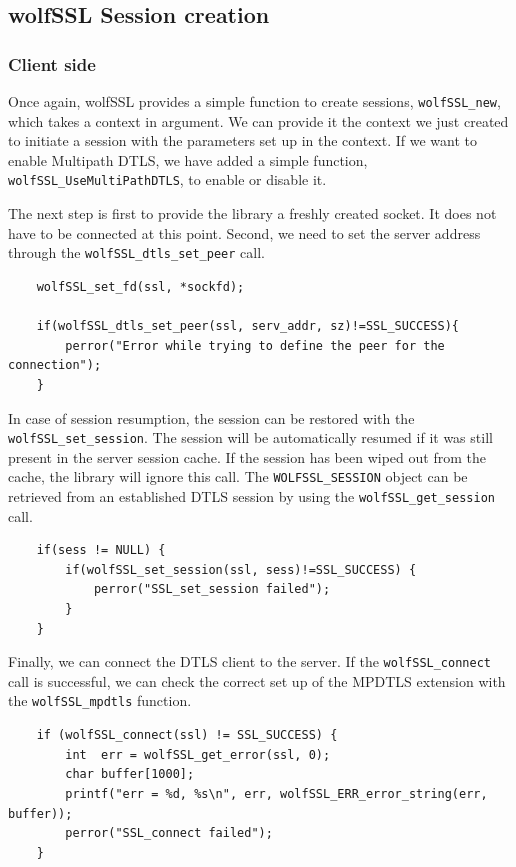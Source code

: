 \subsection{wolfSSL Session creation}

\subsubsection{Client side}

Once again, wolfSSL provides a simple function to create sessions, \texttt{wolfSSL\_new}, which takes a context in argument. We can provide it the context we just created to initiate a session with the parameters set up in the context. If we want to enable Multipath DTLS, we have added a simple function, \texttt{wolfSSL\_UseMultiPathDTLS}, to enable or disable it.

The next step is first to provide the library a freshly created socket. It does not have to be connected at this point. Second, we need to set the server address through the \texttt{wolfSSL\_dtls\_set\_peer} call.

\begin{lstlisting}
    wolfSSL_set_fd(ssl, *sockfd);
    
    if(wolfSSL_dtls_set_peer(ssl, serv_addr, sz)!=SSL_SUCCESS){
        perror("Error while trying to define the peer for the connection");
    }
\end{lstlisting}

In case of session resumption, the session can be restored with the \texttt{wolfSSL\_set\_session}. The session will be automatically resumed if it was still present in the server session cache. If the session has been wiped out from the cache, the library will ignore this call. The \texttt{WOLFSSL\_SESSION} object can be retrieved from an established DTLS session by using the \texttt{wolfSSL\_get\_session} call.

\begin{lstlisting}
    if(sess != NULL) {
        if(wolfSSL_set_session(ssl, sess)!=SSL_SUCCESS) {
            perror("SSL_set_session failed");
        }
    }
\end{lstlisting}

Finally, we can connect the DTLS client to the server. If the \texttt{wolfSSL\_connect} call is successful, we can check the correct set up of the MPDTLS extension with the \texttt{wolfSSL\_mpdtls} function.

\begin{lstlisting}
    if (wolfSSL_connect(ssl) != SSL_SUCCESS) {
        int  err = wolfSSL_get_error(ssl, 0);
        char buffer[1000];
        printf("err = %d, %s\n", err, wolfSSL_ERR_error_string(err, buffer));
        perror("SSL_connect failed");
    }
\end{lstlisting}


